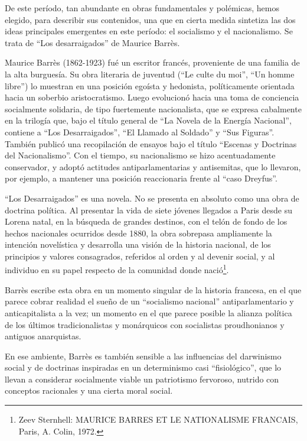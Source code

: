 \documentclass[
]{book}
\begin{document}
De este período, tan abundante en obras fundamentales y polémicas, hemos elegido, para describir sus contenidos, una que en cierta medida sintetiza las dos ideas principales emergentes en este período: el socialismo y el nacionalismo. Se trata de ``Los desarraigados'' de Maurice Barrès.

Maurice Barrès (1862-1923) fué un escritor francés, proveniente de una familia de la alta burguesía. Su obra literaria de juventud (``Le culte du moi'', ``Un homme libre'') lo muestran en una posición egoísta y hedonista, políticamente orientada hacia un soberbio aristocratismo. Luego evolucionó hacia una toma de conciencia socialmente solidaria, de tipo fuertemente nacionalista, que se expresa cabalmente en la trilogía que, bajo el título general de ``La Novela de la Energía Nacional'', contiene a ``Los Desarraigados'', ``El Llamado al Soldado'' y ``Sus Figuras''. También publicó una recopilación de ensayos bajo el título ``Escenas y Doctrinas del Nacionalismo''. Con el tiempo, su nacionalismo se hizo acentuadamente conservador, y adoptó actitudes antiparlamentarias y antisemitas, que lo llevaron, por ejemplo, a mantener una posición reaccionaria frente al ``caso Dreyfus''.

``Los Desarraigados'' es una novela. No se presenta en absoluto como una obra de doctrina política. Al presentar la vida de siete jóvenes llegados a Paris desde su Lorena natal, en la búsqueda de grandes destinos, con el telón de fondo de los hechos nacionales ocurridos desde 1880, la obra sobrepasa ampliamente la intención novelística y desarrolla una visión de la historia nacional, de los principios y valores consagrados, referidos al orden y al devenir social, y al individuo en su papel respecto de la comunidad donde nació\footnote{Zeev Sternhell: MAURICE BARRES ET LE NATIONALISME FRANCAIS, Paris, A. Colin, 1972.}.

Barrès escribe esta obra en un momento singular de la historia francesa, en el que parece cobrar realidad el sueño de un ``socialismo nacional'' antiparlamentario y anticapitalista a la vez; un momento en el que parece posible la alianza política de los últimos tradicionalistas y monárquicos con socialistas proudhonianos y antiguos anarquistas.

En ese ambiente, Barrès es también sensible a las influencias del darwinismo social y de doctrinas inspiradas en un determinismo casi ``fisiológico'', que lo llevan a considerar socialmente viable un patriotismo fervoroso, nutrido con conceptos racionales y una cierta moral social.
\end{document}
